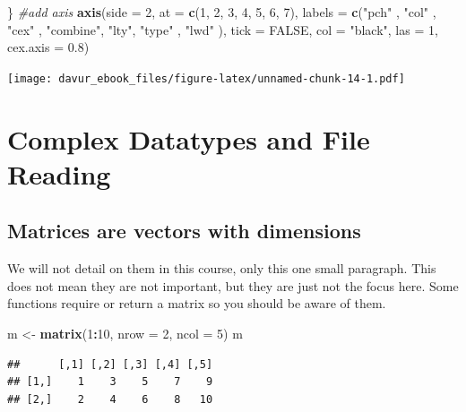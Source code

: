 \documentclass[]{book}
\newenvironment{Shaded}{\begin{snugshade}}{\end{snugshade}}
\newcommand{\CommentTok}[1]{\textcolor[rgb]{0.56,0.35,0.01}{\textit{#1}}}
\newcommand{\DataTypeTok}[1]{\textcolor[rgb]{0.13,0.29,0.53}{#1}}
\newcommand{\DecValTok}[1]{\textcolor[rgb]{0.00,0.00,0.81}{#1}}
\newcommand{\FloatTok}[1]{\textcolor[rgb]{0.00,0.00,0.81}{#1}}
\newcommand{\KeywordTok}[1]{\textcolor[rgb]{0.13,0.29,0.53}{\textbf{#1}}}
\newcommand{\NormalTok}[1]{#1}
\newcommand{\OperatorTok}[1]{\textcolor[rgb]{0.81,0.36,0.00}{\textbf{#1}}}
\newcommand{\OtherTok}[1]{\textcolor[rgb]{0.56,0.35,0.01}{#1}}
\newcommand{\StringTok}[1]{\textcolor[rgb]{0.31,0.60,0.02}{#1}}
\begin{document}
\begin{Shaded}
\begin{Highlighting}[]
\NormalTok{\}}
\CommentTok{#add axis}
\KeywordTok{axis}\NormalTok{(}\DataTypeTok{side =} \DecValTok{2}\NormalTok{, }\DataTypeTok{at =} \KeywordTok{c}\NormalTok{(}\DecValTok{1}\NormalTok{, }\DecValTok{2}\NormalTok{, }\DecValTok{3}\NormalTok{, }\DecValTok{4}\NormalTok{, }\DecValTok{5}\NormalTok{, }\DecValTok{6}\NormalTok{, }\DecValTok{7}\NormalTok{),}
    \DataTypeTok{labels =} \KeywordTok{c}\NormalTok{(}\StringTok{"pch"}\NormalTok{ , }\StringTok{"col"}\NormalTok{ , }\StringTok{"cex"}\NormalTok{ , }\StringTok{"combine"}\NormalTok{, }\StringTok{"lty"}\NormalTok{, }\StringTok{"type"}\NormalTok{ , }\StringTok{"lwd"}\NormalTok{ ),}
    \DataTypeTok{tick =} \OtherTok{FALSE}\NormalTok{, }\DataTypeTok{col =} \StringTok{"black"}\NormalTok{, }\DataTypeTok{las =} \DecValTok{1}\NormalTok{, }\DataTypeTok{cex.axis =} \FloatTok{0.8}\NormalTok{)}
\end{Highlighting}
\end{Shaded}

\texttt{[image: davur\_ebook\_files/figure-latex/unnamed-chunk-14-1.pdf]}

\hypertarget{complex-datatypes-and-file-reading}{%
\chapter{Complex Datatypes and File Reading}\label{complex-datatypes-and-file-reading}}

\hypertarget{matrices-are-vectors-with-dimensions}{%
\section{Matrices are vectors with dimensions}\label{matrices-are-vectors-with-dimensions}}

We will not detail on them in this course, only this one small paragraph. This does not mean they are not important, but they are just not the focus here. Some functions require or return a matrix so you should be aware of them.

\begin{Shaded}
\begin{Highlighting}[]
\NormalTok{m <-}\StringTok{ }\KeywordTok{matrix}\NormalTok{(}\DecValTok{1}\OperatorTok{:}\DecValTok{10}\NormalTok{, }\DataTypeTok{nrow =} \DecValTok{2}\NormalTok{, }\DataTypeTok{ncol =} \DecValTok{5}\NormalTok{) }
\NormalTok{m}
\end{Highlighting}
\end{Shaded}

\begin{verbatim}
##      [,1] [,2] [,3] [,4] [,5]
## [1,]    1    3    5    7    9
## [2,]    2    4    6    8   10
\end{verbatim}
\end{document}
